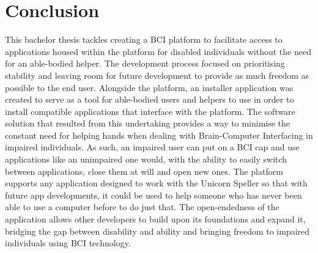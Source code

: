 
\chapter{Conclusion}\label{cap:ending}
This bachelor thesis tackles creating a BCI platform to facilitate access to applications housed within the platform for disabled individuals without the need for an able-bodied helper.
\vspace{\baselineskip}\newline
The development process focused on prioritising stability and leaving room for future development to provide as much freedom as possible to the end user. Alongside the platform, an installer application was created to serve as a tool for able-bodied users and helpers to use in order to install compatible applications that interface with the platform.
\vspace{\baselineskip}\newline
The software solution that resulted from this undertaking provides a way to minimise the constant need for helping hands when dealing with Brain-Computer Interfacing in impaired individuals. As such, an impaired user can put on a BCI cap and use applications like an unimpaired one would, with the ability to easily switch between applications, close them at will and open new ones. The platform supports any application designed to work with the Unicorn Speller so that with future app developments, it could be used to help someone who has never been able to use a computer before to do just that. 
\vspace{\baselineskip}\newline
The open-endedness of the application allows other developers to build upon its foundations and expand it, bridging the gap between disability and ability and bringing freedom to impaired individuals using BCI technology.